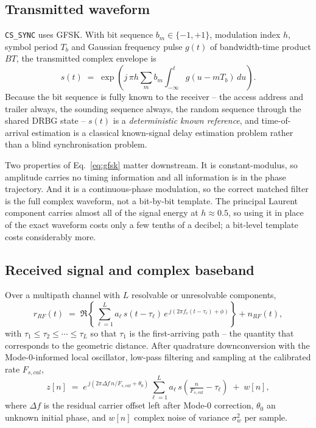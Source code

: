 \documentclass[11pt,a4paper]{article}
\newcommand{\code}[1]{\texttt{\small #1}}
\begin{document}
\subsection{Transmitted waveform}

\code{CS\_SYNC} uses GFSK. With bit sequence $b_m\in\{-1,+1\}$, modulation index $h$, symbol period
$T_b$ and Gaussian frequency pulse $g(t)$ of bandwidth-time product $BT$, the transmitted complex
envelope is
\begin{equation}
s(t) \;=\; \exp\!\left( j\,\pi h \sum_m b_m \int_{-\infty}^{t} g(u - mT_b)\,du \right).
\label{eq:gfsk}
\end{equation}
Because the bit sequence is fully known to the receiver -- the access address and trailer always,
the sounding sequence always, the random sequence through the shared DRBG state -- $s(t)$ is a
\emph{deterministic known reference}, and time-of-arrival estimation is a classical known-signal
delay estimation problem rather than a blind synchronisation problem.

Two properties of Eq.~\eqref{eq:gfsk} matter downstream. It is constant-modulus, so amplitude
carries no timing information and all information is in the phase trajectory. And it is a
continuous-phase modulation, so the correct matched filter is the full complex waveform, not a
bit-by-bit template. The principal Laurent component carries almost all of the signal energy at
$h \approx 0.5$, so using it in place of the exact waveform costs only a few tenths of a decibel; a
bit-level template costs considerably more.

\subsection{Received signal and complex baseband}

Over a multipath channel with $L$ resolvable or unresolvable components,
\begin{equation}
r_{RF}(t) \;=\; \Re\!\left\{ \sum_{\ell=1}^{L} a_\ell\, s(t-\tau_\ell)\,
   e^{\,j\left(2\pi f_c (t-\tau_\ell) + \phi\right)} \right\} + n_{RF}(t),
\label{eq:rx}
\end{equation}
with $\tau_1 \le \tau_2 \le \cdots \le \tau_L$ so that $\tau_1$ is the first-arriving path -- the
quantity that corresponds to the geometric distance. After quadrature downconversion with the
Mode-0-informed local oscillator, low-pass filtering and sampling at the calibrated rate
$F_{s,cal}$,
\begin{equation}
z[n] \;=\; e^{\,j(2\pi \Delta f\, n/F_{s,cal} + \theta_0)}
   \sum_{\ell=1}^{L} a_\ell\, s\!\left(\tfrac{n}{F_{s,cal}} - \tau_\ell\right) \;+\; w[n],
\label{eq:baseband}
\end{equation}
where $\Delta f$ is the residual carrier offset left after Mode-0 correction, $\theta_0$ an unknown
initial phase, and $w[n]$ complex noise of variance $\sigma_w^2$ per sample.
\end{document}
